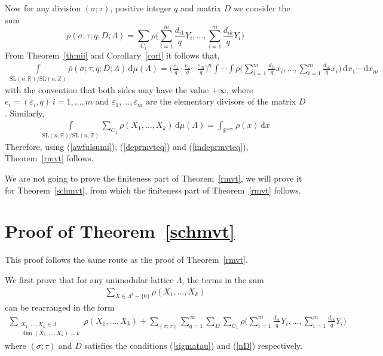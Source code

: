 \documentclass[11pt]{article}
\theoremstyle{definition}
\theoremstyle{proof}
\begin{document}
Now for any division $(\sigma; \tau )$, positive integer $q$ and matrix $D$ we consider the sum
\[
    \bar{\rho }(\sigma; \tau; q; D; \Lambda )= \sum_{C_1} \rho \bigg(\sum_{i=1}^{m}\frac{d_{i1}}{q}Y_i, \ldots, \sum_{i=1}^{m}\frac{d_{ik}}{q}Y_i \bigg)
\]
From Theorem~\ref{thmii} and Corollary~\ref{cori} it follows that,
\begin{align}\label{deprmvteq}
    \int\limits_{\mathrm{SL}(n,\mathbb{R})/\mathrm{SL}(n,\mathbb{Z})} \bar{\rho }(\sigma; \tau; q; D; \Lambda ) \, \mathrm{d} \mu (\Lambda ) = \bigg(\frac{e_1}{q} \cdot \frac{e_2}{q} \cdots \frac{e_m}{q}\bigg)^n \int \cdots \int \rho \bigg(\sum_{i=1}^{m}\frac{d_{i1}}{q}x_i, \ldots, \sum_{i=1}^{m}\frac{d_{ik}}{q}x_i\bigg) \, \mathrm{d} x_1 \cdots \, \mathrm{d} x_m
\end{align}
with the convention that both sides may have the value $+\infty$, where $e_i=(\varepsilon _i, q) \ i=1, \ldots, m$ and $\varepsilon _1, \ldots, \varepsilon _m$ are the elementary divisors of the matrix $D$.
Similarly,
\begin{align}\label{indeprmvteq}
    \int\limits_{\mathrm{SL}(n,\mathbb{R})/\mathrm{SL}(n,\mathbb{Z})} \sum_{C_1} \rho (X_1, \ldots, X_k) \, \mathrm{d} \mu (\Lambda ) = \int_{\mathbb{R}^{nm}} \rho (x) \, \mathrm{d} x
\end{align}
Therefore, using (\ref{awfulsumi}), (\ref{deprmvteq}) and (\ref{indeprmvteq}), Theorem~\ref{rmvt} follows.

We are not going to prove the finiteness part of Theorem~\ref{rmvt}, we will prove it for Theorem~\ref{schmvt}, from which the finiteness part of Theorem~\ref{rmvt} follows.

\section{Proof of Theorem~\ref{schmvt}}
This proof follows the same route as the proof of Theorem~\ref{rmvt}.

We first prove that for any unimodular lattice $\Lambda$, the terms in the sum
\begin{align}\label{awfulsumlhsii}
    \sum_{X \in \Lambda ^k - \{0\}} \rho(X_1, \ldots, X_k)
\end{align}
can be rearranged in the form
\begin{align}\label{awfulsumrhsii}
    \sum_{\substack{X_1, \ldots, X_k \in \Lambda \\ \dim (X_1, \ldots, X_k) = k}} \rho(X_1, \ldots, X_k) + \sum_{(\sigma ; \tau )}\sum_{q = 1}^{\infty} \sum_{D} \sum_{C_1} \rho\bigg(\sum_{i=1}^{m}\frac{d_{i1}}{q}Y_i, \ldots, \sum_{i=1}^{m}\frac{d_{ik}}{q}Y_i \bigg)
\end{align}
where $(\sigma; \tau )$ and $D$ satisfies the conditions (\ref{sigmatau}) and (\ref{nD}) respectively.
\end{document}
